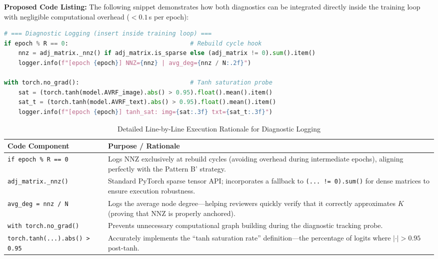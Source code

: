 \documentclass[12pt, a4paper]{article}
\begin{document}
\vspace{0.5em}
\noindent \textbf{Proposed Code Listing:} The following snippet demonstrates how both diagnostics can be integrated directly inside the training loop with negligible computational overhead ($<0.1$\,s per epoch):

\begin{lstlisting}[language=Python]
# === Diagnostic Logging (insert inside training loop) ===
if epoch % R == 0:                                  # Rebuild cycle hook
    nnz = adj_matrix._nnz() if adj_matrix.is_sparse else (adj_matrix != 0).sum().item()
    logger.info(f"[epoch {epoch}] NNZ={nnz} | avg_deg={nnz / N:.2f}")

with torch.no_grad():                               # Tanh saturation probe
    sat = (torch.tanh(model.AVRF_image).abs() > 0.95).float().mean().item()
    sat_t = (torch.tanh(model.AVRF_text).abs() > 0.95).float().mean().item()
    logger.info(f"[epoch {epoch}] tanh_sat: img={sat:.3f} txt={sat_t:.3f}")
\end{lstlisting}

\begin{table}[htbp]
\centering
\caption{Detailed Line-by-Line Execution Rationale for Diagnostic Logging}
\vspace{0.5em}
\renewcommand{\arraystretch}{1.3}
\begin{tabular}{|l|p{8.8cm}|}
\hline
\textbf{Code Component} & \textbf{Purpose / Rationale} \\
\hline
\texttt{if epoch \% R == 0} & Logs NNZ exclusively at rebuild cycles (avoiding overhead during intermediate epochs), aligning perfectly with the Pattern B' strategy. \\
\hline
\texttt{adj\_matrix.\_nnz()} & Standard PyTorch sparse tensor API; incorporates a fallback to \texttt{(... != 0).sum()} for dense matrices to ensure execution robustness. \\
\hline
\texttt{avg\_deg = nnz / N} & Logs the average node degree---helping reviewers quickly verify that it correctly approximates $K$ (proving that NNZ is properly anchored). \\
\hline
\texttt{with torch.no\_grad()} & Prevents unnecessary computational graph building during the diagnostic tracking probe. \\
\hline
\texttt{torch.tanh(...).abs() > 0.95} & Accurately implements the ``tanh saturation rate'' definition---the percentage of logits where $|\cdot| > 0.95$ post-tanh. \\
\hline
\end{tabular}
\end{table}
\end{document}
